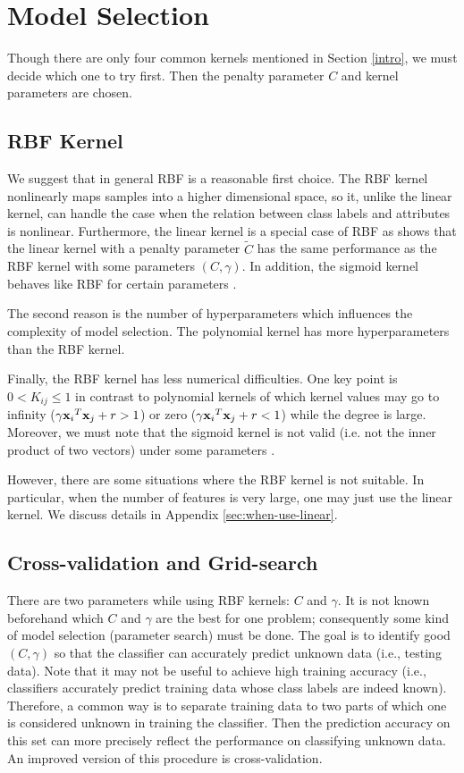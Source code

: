 \documentclass[12pt]{article}
\def\bx{{\bf x}}
\begin{document}
\section{Model Selection}
Though there are only four common kernels 
mentioned in Section \ref{intro}, we must decide 
which one to try first. Then the penalty parameter 
$C$ and kernel parameters are chosen.

\subsection{RBF Kernel}
\label{sec:rbf-kernel}
We suggest that in 
general RBF is a reasonable first choice.
The RBF kernel nonlinearly maps 
samples into a higher dimensional space, so it, 
unlike the linear kernel, can handle the case when
the relation between class labels and 
attributes is nonlinear. Furthermore, the
linear kernel is a special case
of RBF as \cite{SSK02b} shows that the linear kernel 
with a penalty parameter $\tilde{C}$ has the same performance
as the RBF kernel with some parameters $(C, \gamma)$. In
addition, the sigmoid 
kernel behaves like RBF for certain parameters
\cite{HTL03a}.

The second reason is the number of hyperparameters
which influences the complexity of model selection.
The polynomial kernel has more hyperparameters
than the RBF kernel.

Finally, the RBF kernel has less numerical difficulties.
One key point is $0 < K_{ij} \leq 1$ in contrast to 
polynomial kernels of which kernel values may go to 
infinity ($\gamma {\bx_i}^T \bx_j + r > 1$) or zero 
($\gamma {\bx_i}^T \bx_j + r < 1$) while the degree is large.
Moreover, we must note that the sigmoid kernel is  
not valid (i.e. not the inner product of two vectors) 
under some parameters \cite{VV95a}.


However, there are some situations where the
RBF kernel is not suitable. In particular, 
when the number of features is very large,
one may just use the linear kernel. We 
discuss details in Appendix
\ref{sec:when-use-linear}.

\subsection{Cross-validation and Grid-search}
\label{cross}
There are two parameters 
while using RBF kernels: $C$ and $\gamma$. 
It is not known beforehand which $C$ and 
$\gamma$ are the best for one problem;
consequently some kind of model selection 
(parameter search) must be done. The goal is
to identify good $(C, \gamma)$ so that the classifier 
can accurately predict unknown data (i.e., testing data).
Note that it may not be useful to achieve high 
training accuracy (i.e., classifiers accurately 
predict training data whose class labels are indeed 
known). Therefore, a common way is to separate 
training data to two parts of which one is considered
unknown in training the classifier. Then the prediction
accuracy on this set can more precisely reflect the
performance on classifying unknown data. An improved version of
this procedure is cross-validation.
\end{document}
